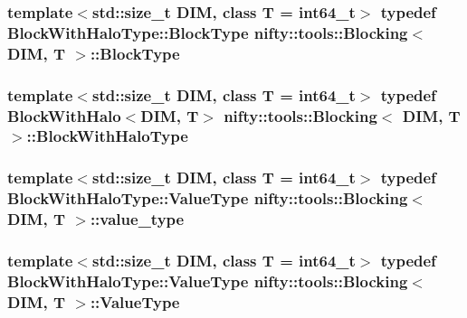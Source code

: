 \subsubsection[{Block\+Type}]{\setlength{\rightskip}{0pt plus 5cm}template$<$std\+::size\+\_\+t D\+I\+M, class T  = int64\+\_\+t$>$ typedef {\bf Block\+With\+Halo\+Type\+::\+Block\+Type} {\bf nifty\+::tools\+::\+Blocking}$<$ D\+I\+M, T $>$\+::{\bf Block\+Type}}\label{classnifty_1_1tools_1_1Blocking_a597e0d4186d2d40ccb96698cc16775c6}
\hypertarget{classnifty_1_1tools_1_1Blocking_abebd9361d89cc399bc495861fa4e331d}{}
\subsubsection[{Block\+With\+Halo\+Type}]{\setlength{\rightskip}{0pt plus 5cm}template$<$std\+::size\+\_\+t D\+I\+M, class T  = int64\+\_\+t$>$ typedef {\bf Block\+With\+Halo}$<$D\+I\+M, T$>$ {\bf nifty\+::tools\+::\+Blocking}$<$ D\+I\+M, T $>$\+::{\bf Block\+With\+Halo\+Type}}\label{classnifty_1_1tools_1_1Blocking_abebd9361d89cc399bc495861fa4e331d}
\hypertarget{classnifty_1_1tools_1_1Blocking_a4ea21e967d25e621a000176dc994c85e}{}
\subsubsection[{value\+\_\+type}]{\setlength{\rightskip}{0pt plus 5cm}template$<$std\+::size\+\_\+t D\+I\+M, class T  = int64\+\_\+t$>$ typedef {\bf Block\+With\+Halo\+Type\+::\+Value\+Type} {\bf nifty\+::tools\+::\+Blocking}$<$ D\+I\+M, T $>$\+::{\bf value\+\_\+type}}\label{classnifty_1_1tools_1_1Blocking_a4ea21e967d25e621a000176dc994c85e}
\hypertarget{classnifty_1_1tools_1_1Blocking_ae04f69cd6e67bbde26eee3f38e0257f7}{}
\subsubsection[{Value\+Type}]{\setlength{\rightskip}{0pt plus 5cm}template$<$std\+::size\+\_\+t D\+I\+M, class T  = int64\+\_\+t$>$ typedef {\bf Block\+With\+Halo\+Type\+::\+Value\+Type} {\bf nifty\+::tools\+::\+Blocking}$<$ D\+I\+M, T $>$\+::{\bf Value\+Type}}\label{classnifty_1_1tools_1_1Blocking_ae04f69cd6e67bbde26eee3f38e0257f7}
\hypertarget{classnifty_1_1tools_1_1Blocking_a5f8df3d4cdf09803217d729a04018fb3}{}
